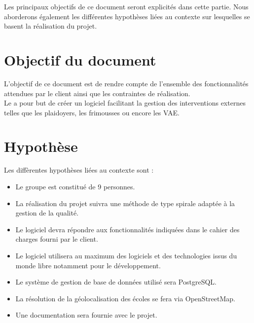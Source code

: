 	Les principaux objectifs de ce document seront explicités dans cette partie. Nous aborderons également les différentes hypothèses liées au contexte sur lesquelles se basent la réalisation du projet.


\section{Objectif du document}
	L'objectif de ce document est de rendre compte de l'ensemble des fonctionnalités attendues par le client ainsi que les contraintes de réalisation. \\
	
	Le \PICCourt \nomClient{} a pour but de créer un logiciel facilitant la gestion des interventions externes telles que les plaidoyers, les frimousses ou encore les VAE.
	
	
\section{Hypothèse}
	Les diffèrentes hypothèses liées au contexte sont :
	\begin{itemize}
		\item Le groupe \nomEquipe{} est constitué de 9 personnes.
		\item La réalisation du projet suivra une méthode de type spirale adaptée à la gestion de la qualité.
		\item Le logiciel devra répondre aux fonctionnalités indiquées dans le cahier des charges fourni par le client.
		\item Le logiciel utilisera au maximum des logiciels et des technologies issus du monde libre notamment pour le développement.
		\item Le système de gestion de base de données utilisé sera PostgreSQL.
		\item La résolution de la géolocalisation des écoles se fera via OpenStreetMap.
		\item Une documentation sera fournie avec le projet.
	\end{itemize}
	